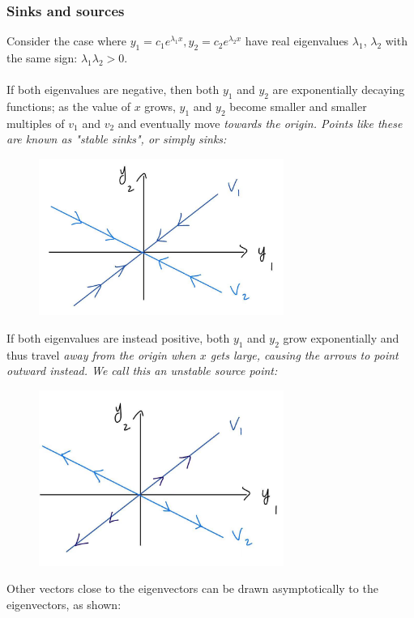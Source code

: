 \documentclass{article}
\begin{document}
\subsubsection*{Sinks and sources}
Consider the case where $y_1 = c_1e^{\lambda_1 x}, y_2 =c_2e^{\lambda_2 x}$ have real eigenvalues $\lambda_1$, $\lambda_2$ with the same sign: $\lambda_1\lambda_2>0$. \\ \\
If both eigenvalues are negative, then both $y_1$ and $y_2$ are exponentially decaying functions; as the value of $x$ grows, $y_1$ and $y_2$ become smaller and smaller multiples of $v_1$ and $v_2$ and eventually move \it towards \normalfont the origin. Points like these are known as "stable sinks", or simply sinks:
\begin{figure}[h]
    \centering
    \includegraphics[width=8cm]{DE-ch4-stablesink.jpg}
\end{figure}
If both eigenvalues are instead positive, both $y_1$ and $y_2$ grow exponentially and thus travel \it away \normalfont from the origin when $x$ gets large, causing the arrows to point outward instead. We call this an \it unstable source \normalfont point:\newpage
\begin{figure}[h]
    \centering
    \includegraphics[width=8cm]{DE-ch4-unstablesource.jpg}
\end{figure}
Other vectors close to the eigenvectors can be drawn asymptotically to the eigenvectors, as shown:
\end{document}
